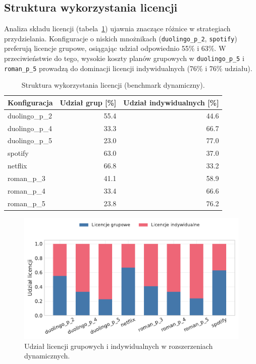 \subsection{Struktura wykorzystania licencji}

Analiza składu licencji (tabela~\ref{tab:ext-dynamic-license-mix}) ujawnia znaczące różnice w strategiach przydzielania. Konfiguracje o niskich mnożnikach (\texttt{duolingo\_p\_2}, \texttt{spotify}) preferują licencje grupowe, osiągając udział odpowiednio 55\% i 63\%. W przeciwieństwie do tego, wysokie koszty planów grupowych w \texttt{duolingo\_p\_5} i \texttt{roman\_p\_5} prowadzą do dominacji licencji indywidualnych (76\% i 76\% udziału).

\begin{table}[H]
  \centering
  \caption{Struktura wykorzystania licencji (benchmark dynamiczny).}
  \label{tab:ext-dynamic-license-mix}
  \begin{tabular}{lrr}
    \toprule
    \textbf{Konfiguracja} & \textbf{Udział grup [\%]} & \textbf{Udział indywidualnych [\%]} \\
    \midrule
    duolingo\_p\_2        & 55.4                      & 44.6                                \\
    duolingo\_p\_4        & 33.3                      & 66.7                                \\
    duolingo\_p\_5        & 23.0                      & 77.0                                \\
    spotify               & 63.0                      & 37.0                                \\
    netflix               & 66.8                      & 33.2                                \\
    roman\_p\_3           & 41.1                      & 58.9                                \\
    roman\_p\_4           & 33.4                      & 66.6                                \\
    roman\_p\_5           & 23.8                      & 76.2                                \\
    \bottomrule
  \end{tabular}
\end{table}

\begin{figure}[H]
  \centering
  \includegraphics[width=0.8\linewidth]{assets/figures/extensions/dynamic/license_mix.pdf}
  \caption{Udział licencji grupowych i indywidualnych w rozszerzeniach dynamicznych.}
  \label{fig:ext-dynamic-license-mix}
\end{figure}

